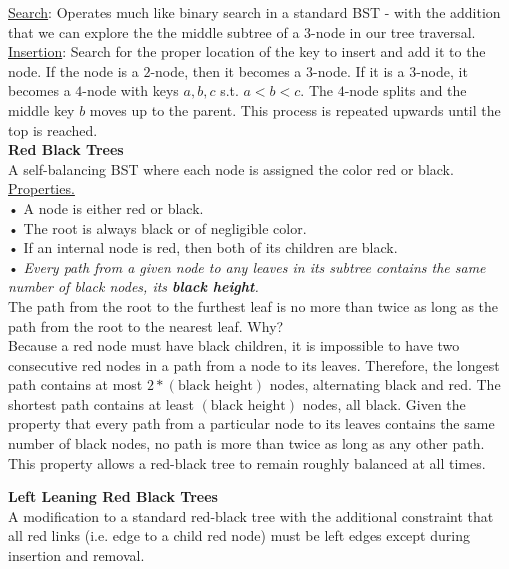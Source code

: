 \documentclass[12pt, fleqn]{general}
\begin{document}
\begin{multicols*}{2}
    \underline{Search}: Operates much like binary search in a standard BST - with the addition that we can explore the the middle subtree of a $3$-node in our tree traversal.\\

    \underline{Insertion}: Search for the proper location of the key to insert and add it to the node. If the node is a $2$-node, then it becomes a $3$-node. If it is a $3$-node, it becomes a $4$-node with keys $a, b, c$ s.t. $a < b < c$. The $4$-node splits and the middle key $b$ moves up to the parent. This process is repeated upwards until the top is reached.\\

    \textbf{Red Black Trees}\\

    A self-balancing BST where each node is assigned the color red or black.\\

    \underline{Properties.}\\
    • A node is either red or black.\\
    • The root is always black or of negligible color.\\
    • If an internal node is red, then both of its children are black.\\
    • \emph{Every path from a given node to any leaves in its subtree contains the same number of black nodes, its \textbf{black height}.}\\

    The path from the root to the furthest leaf is no more than twice as long as the path from the root to the nearest leaf. Why?\\
    
    Because a red node must have black children, it is impossible to have two consecutive red nodes in a path from a node to its leaves. Therefore, the longest path contains at most $2*(\text{black height})$ nodes, alternating black and red. The shortest path contains at least $(\text{black height})$ nodes, all black. Given the property that every path from a
    particular node to its leaves contains the same number of black nodes, no path is more than twice as long as any other path.\\

    This property allows a red-black tree to remain roughly balanced at all times.

    \textbf{Left Leaning Red Black Trees}\\

    A modification to a standard red-black tree with the additional constraint that all red links (i.e. edge to a child red node) must be left edges except during insertion and removal.\\


\end{multicols*}
\end{document}
